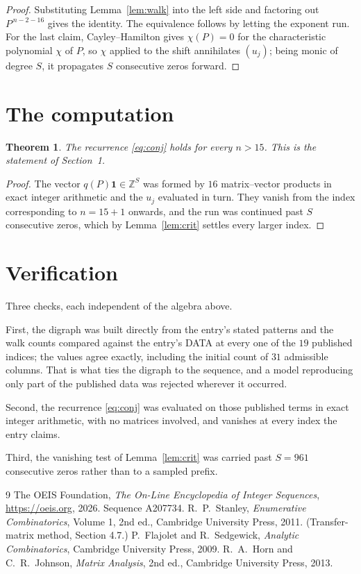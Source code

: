 \documentclass[11pt,a4paper]{article}
\theoremstyle{plain}
\newtheorem{theorem}{Theorem}
\theoremstyle{definition}
\begin{document}
\begin{proof}
Substituting Lemma~\ref{lem:walk} into the left side and factoring out
$P^{\,n-2-16}$ gives the identity. The equivalence follows by letting the exponent
run. For the last claim, Cayley--Hamilton gives $\chi(P)=0$ for the characteristic
polynomial $\chi$ of $P$, so $\chi$ applied to the shift annihilates $(u_j)$; being monic of
degree $S$, it propagates $S$ consecutive zeros forward.
\end{proof}

\section{The computation}

\begin{theorem}
The recurrence \eqref{eq:conj} holds for every $n>15$. This is the statement of
Section~1.
\end{theorem}

\begin{proof}
The vector $q(P)\mathbf{1}\in\mathbb{Z}^{S}$ was formed by $16$ matrix--vector
products in exact integer arithmetic and the $u_j$ evaluated in turn. They vanish from the
index corresponding to $n=15+1$ onwards, and the run was continued past $S$ consecutive
zeros, which by Lemma~\ref{lem:crit} settles every larger index.
\end{proof}

\section{Verification}

Three checks, each independent of the algebra above.

First, the digraph was built directly from the entry's stated patterns and the walk counts
compared against the entry's DATA at every one of the $19$ published indices; the
values agree exactly, including the initial count of $31$ admissible columns. That is
what ties the digraph to the sequence, and a model reproducing only part of the published
data was rejected wherever it occurred.

Second, the recurrence \eqref{eq:conj} was evaluated on those published terms in exact
integer arithmetic, with no matrices involved, and vanishes at every index the entry claims.

Third, the vanishing test of Lemma~\ref{lem:crit} was carried past $S=961$ consecutive
zeros rather than to a sampled prefix.

\begin{thebibliography}{9}
 The OEIS Foundation, \emph{The On-Line Encyclopedia of Integer
Sequences}, \url{https://oeis.org}, 2026. Sequence A207734.
 R.~P.~Stanley, \emph{Enumerative Combinatorics}, Volume 1, 2nd ed.,
Cambridge University Press, 2011. (Transfer-matrix method, Section 4.7.)
 P.~Flajolet and R.~Sedgewick, \emph{Analytic Combinatorics}, Cambridge
University Press, 2009.
 R.~A.~Horn and C.~R.~Johnson, \emph{Matrix Analysis}, 2nd ed., Cambridge
University Press, 2013.
\end{thebibliography}
\end{document}
